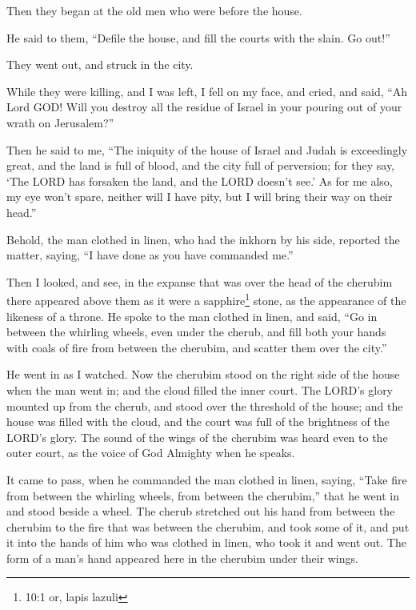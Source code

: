 Then they began at the old men who were before the house.

\myverse{}He said to them, “Defile the house, and fill the courts with the
slain. Go out!”

They went out, and struck in the city.

\myverse{}While they were killing, and I was left, I fell on my face, and
cried, and said, “Ah Lord GOD! Will you destroy all the residue of Israel in your pouring out of your
wrath on Jerusalem?”

\myverse{}Then he said to me, “The iniquity of the house of Israel and Judah
is exceedingly great, and the land is full of blood, and the city full of perversion; for they say, ‘The
LORD has forsaken the land, and the LORD doesn’t see.’
\myverse{}As for me also, my eye won’t spare, neither will I have pity, but I will bring
their way on their head.”

\myverse{}Behold, the man clothed in linen, who had the inkhorn by his
side, reported the matter, saying, “I have done as you have commanded me.”


\mychapter{} \myverse*{}Then I looked, and see, in the expanse that was over the head
of the cherubim there appeared above them as it were a sapphire\footnote{10:1 or, lapis lazuli
} stone, as the appearance of the likeness of a throne.
\myverse{}He spoke to the man clothed in linen, and said, “Go in between the whirling
wheels, even under the cherub, and fill both your hands with coals of fire from between the cherubim,
and scatter them over the city.”

He went in as I watched.
\myverse{}Now the cherubim stood on the right side of the house when the man went in;
and the cloud filled the inner court.
\myverse{}The LORD’s glory mounted up from the cherub, and stood over the threshold of
the house; and the house was filled with the cloud, and the court was full of the brightness of the LORD’s
glory.
\myverse{}The sound of the wings of the cherubim was heard even to the outer court, as
the voice of God Almighty when he speaks.

\myverse{}It came to pass, when he commanded the man clothed in linen, saying,
“Take fire from between the whirling wheels, from between the cherubim,” that he went in and stood beside
a wheel.
\myverse{}The cherub stretched out his hand from between the cherubim to the fire that
was between the cherubim, and took some of it, and put it into the hands of him who was clothed in linen,
who took it and went out.
\myverse{}The form of a man’s hand appeared here in the cherubim under their wings.


